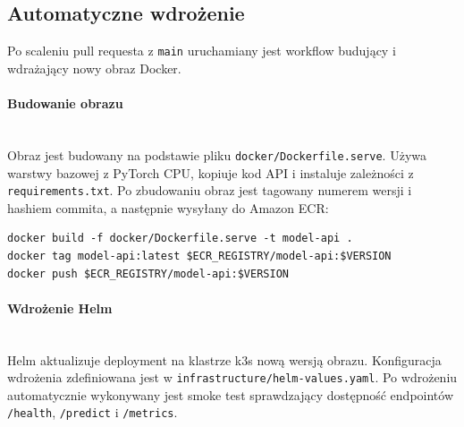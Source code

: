 \subsection{Automatyczne wdrożenie}

Po scaleniu pull requesta z \texttt{main} uruchamiany jest workflow budujący i wdrażający nowy obraz Docker.

\paragraph{Budowanie obrazu}\mbox{}\\
Obraz jest budowany na podstawie pliku \texttt{docker/Dockerfile.serve}. Używa warstwy bazowej z PyTorch CPU, kopiuje kod API i instaluje zależności z \texttt{requirements.txt}. Po zbudowaniu obraz jest tagowany numerem wersji i hashiem commita, a następnie wysyłany do Amazon ECR:

\begin{verbatim}
docker build -f docker/Dockerfile.serve -t model-api .
docker tag model-api:latest $ECR_REGISTRY/model-api:$VERSION
docker push $ECR_REGISTRY/model-api:$VERSION
\end{verbatim}

\paragraph{Wdrożenie Helm}\mbox{}\\
Helm \cite{helm_docs} aktualizuje deployment na klastrze k3s \cite{k3s_docs} nową wersją obrazu. Konfiguracja wdrożenia zdefiniowana jest w \texttt{infrastructure/helm-values.yaml}. Po wdrożeniu automatycznie wykonywany jest smoke test sprawdzający dostępność endpointów \texttt{/health}, \texttt{/predict} i \texttt{/metrics}.

